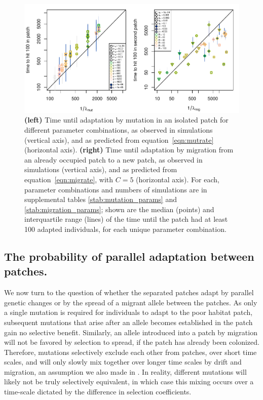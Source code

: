 \documentclass{article}
\newcommand{\citep}[1]{\cite{#1}}
\begin{document}
\begin{figure}[ht!]
  \begin{center}
      \includegraphics{times-predicted-observed}
  \end{center}
  \caption{
      \textbf{(left)} 
      Time until adaptation by mutation in an isolated patch for different parameter combinations,
      as observed in simulations (vertical axis),
      and as predicted from equation~\eqref{eqn:mutrate} (horizontal axis).
      \textbf{(right)} 
      Time until adaptation by migration from an already occupied patch to a new patch,
      as observed in simulations (vertical axis),
      and as predicted from equation~\eqref{eqn:migrate}, with $C=5$ (horizontal axis).
      For each,
      parameter combinations and numbers of simulations are in supplemental tables \ref{stab:mutation_params} and \ref{stab:migration_params};
      shown are the median (points) and interquartile range (lines)
      of the time until the patch had at least 100 adapted individuals,
      for each unique parameter combination.
  }   \label{fig:sim_times}
\end{figure}




\subsection[Probability of Parallel Adaptation]{The probability of parallel adaptation between patches.} 
\label{ss:probparallel}

We now turn to the question of whether the separated patches adapt by parallel genetic changes 
or by the spread of a migrant allele between the patches.
As only a single mutation is required for individuals to adapt to the
poor habitat patch, subsequent mutations that arise after an allele becomes established in the patch gain no selective benefit. 
Similarly, an allele introduced into a patch by migration will not be favored by selection to spread, 
if the patch has already been colonized. 
Therefore, mutations selectively exclude each other from patches, over short time scales, 
and will only slowly mix together over longer time scales by drift and migration,
an assumption we also made in \citep{ralph2010parallel}. 
In reality, different mutations will likely not be truly selectively equivalent,
in which case this mixing occurs over a time-scale dictated by the difference in selection coefficients.
\end{document}
